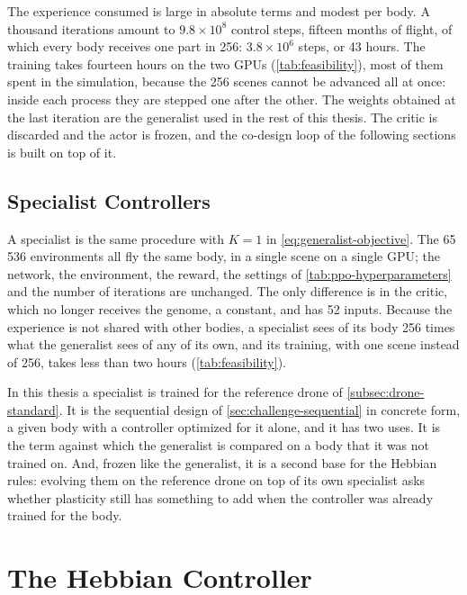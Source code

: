 The experience consumed is large in absolute terms and modest per body. A thousand iterations amount to $9.8 \times 10^{8}$ control steps, fifteen months of flight, of which every body receives one part in 256: $3.8 \times 10^{6}$ steps, or 43 hours. The training takes fourteen hours on the two GPUs (\autoref{tab:feasibility}), most of them spent in the simulation, because the 256 scenes cannot be advanced all at once: inside each process they are stepped one after the other. The weights obtained at the last iteration are the generalist used in the rest of this thesis. The critic is discarded and the actor is frozen, and the co-design loop of the following sections is built on top of it.

\subsection{Specialist Controllers}
\label{subsec:specialist-training}

A specialist is the same procedure with $K = 1$ in \eqref{eq:generalist-objective}. The 65\,536 environments all fly the same body, in a single scene on a single GPU; the network, the environment, the reward, the settings of \autoref{tab:ppo-hyperparameters} and the number of iterations are unchanged. The only difference is in the critic, which no longer receives the genome, a constant, and has 52 inputs. Because the experience is not shared with other bodies, a specialist sees of its body 256 times what the generalist sees of any of its own, and its training, with one scene instead of 256, takes less than two hours (\autoref{tab:feasibility}).

In this thesis a specialist is trained for the reference drone of \autoref{subsec:drone-standard}. It is the sequential design of \autoref{sec:challenge-sequential} in concrete form, a given body with a controller optimized for it alone, and it has two uses. It is the term against which the generalist is compared on a body that it was not trained on. And, frozen like the generalist, it is a second base for the Hebbian rules: evolving them on the reference drone on top of its own specialist asks whether plasticity still has something to add when the controller was already trained for the body.

\section{The Hebbian Controller}
\label{sec:hebbian-controller}

